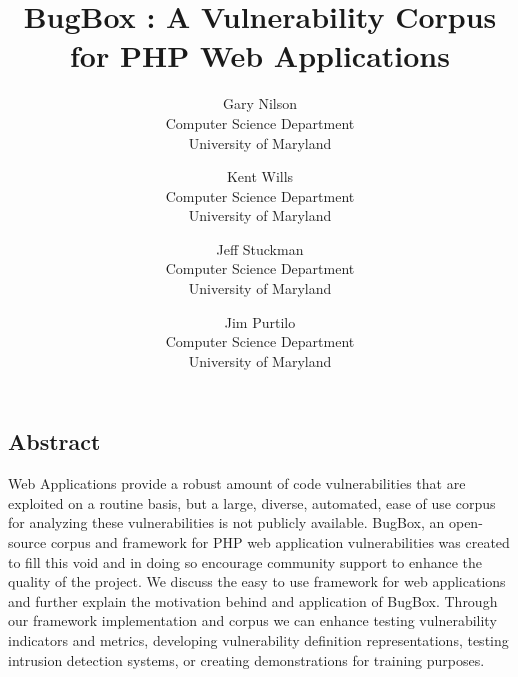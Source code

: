 \documentclass[letterpaper,twocolumn,10pt]{article}
\begin{document}
\date{}


\title{\Large \bf BugBox : A Vulnerability Corpus for PHP Web Applications}


\author{
{\rm Gary Nilson}\\
Computer Science Department\\University of Maryland
\and
{\rm Kent Wills}\\
Computer Science Department\\University of Maryland
\and
{\rm Jeff Stuckman}\\
Computer Science Department\\University of Maryland
\and
{\rm Jim Purtilo}\\
Computer Science Department\\University of Maryland
} %

\maketitle

\thispagestyle{empty}

\subsection*{Abstract}

Web Applications provide a robust amount of code vulnerabilities that are exploited on a routine basis, but a large, diverse, automated, ease of use corpus for analyzing these vulnerabilities is not publicly available.   BugBox, an open-source corpus and framework for PHP web application vulnerabilities was created to fill this void and in doing so encourage community support to enhance the quality of the project.  We discuss the easy to use framework for web applications and further explain the motivation behind and application of BugBox.  Through our framework implementation and corpus we can enhance testing vulnerability indicators and metrics, developing vulnerability definition representations, testing intrusion detection systems, or creating demonstrations for training purposes.  
\end{document}
